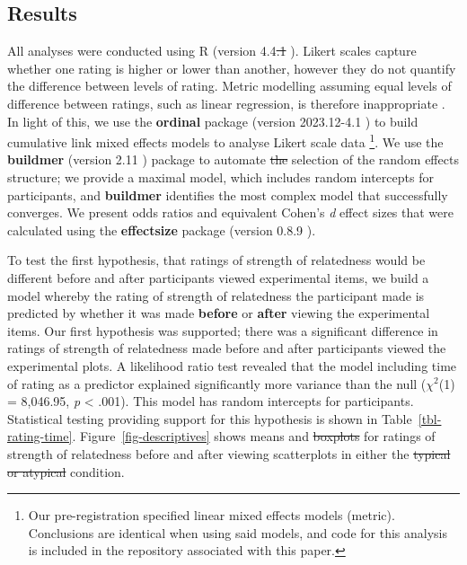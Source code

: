 \documentclass[manuscript,screen,review,anonymous]{acmart}
\providecommand{\DIFaddtex}[1]{{\protect\color{blue}\uwave{#1}}} %
\providecommand{\DIFdeltex}[1]{{\protect\color{red}\sout{#1}}} %
\providecommand{\DIFaddbegin}{} %
\providecommand{\DIFaddend}{} %
\providecommand{\DIFdelbegin}{} %
\providecommand{\DIFdelend}{} %
\providecommand{\DIFadd}[1]{\texorpdfstring{\DIFaddtex{#1}}{#1}} %
\providecommand{\DIFdel}[1]{\texorpdfstring{\DIFdeltex{#1}}{}} %
\newcommand{\DIFscaledelfig}{0.5}
\newlength{\DIFdelgraphicswidth} %
\newlength{\DIFdelgraphicsheight} %
\newcommand{\DIFaddincludegraphics}[2][]{{\color{blue}\fbox{\DIFOincludegraphics[#1]{#2}}}} %
\newcommand{\DIFdelincludegraphics}[2][]{%
\sbox{\DIFdelgraphicsbox}{\DIFOincludegraphics[#1]{#2}}%
\settoboxwidth{\DIFdelgraphicswidth}{\DIFdelgraphicsbox} %
\settoboxtotalheight{\DIFdelgraphicsheight}{\DIFdelgraphicsbox} %
\scalebox{\DIFscaledelfig}{%
\parbox[b]{\DIFdelgraphicswidth}{\usebox{\DIFdelgraphicsbox}\\[-\baselineskip] \rule{\DIFdelgraphicswidth}{0em}}\llap{\resizebox{\DIFdelgraphicswidth}{\DIFdelgraphicsheight}{%
\setlength{\unitlength}{\DIFdelgraphicswidth}%
\begin{picture}(1,1)%
\thicklines\linethickness{2pt} %
{\color[rgb]{1,0,0}\put(0,0){\framebox(1,1){}}}%
{\color[rgb]{1,0,0}\put(0,0){\line( 1,1){1}}}%
{\color[rgb]{1,0,0}\put(0,1){\line(1,-1){1}}}%
\end{picture}%
}\hspace*{3pt}}} %
} %
\DeclareRobustCommand{\DIFaddbegin}{\DIFOaddbegin \let\includegraphics\DIFaddincludegraphics} %
\DeclareRobustCommand{\DIFaddend}{\DIFOaddend \let\includegraphics\DIFOincludegraphics} %
\DeclareRobustCommand{\DIFdelbegin}{\DIFOdelbegin \let\includegraphics\DIFdelincludegraphics} %
\DeclareRobustCommand{\DIFdelend}{\DIFOaddend \let\includegraphics\DIFOincludegraphics} %
\begin{document}
\subsection{Results}\label{sec-results-main}

All analyses were conducted using R (version 4.4\DIFdelbegin \DIFdel{.1 }\DIFdelend \DIFaddbegin \DIFadd{.2 }\DIFaddend \citep{rcore}).
Likert scales capture whether one rating is higher or lower than
another, however they do not quantify the difference between levels of
rating. Metric modelling assuming equal levels of difference between
ratings, such as linear regression, is therefore inappropriate
\citep{liddell_2018}. In light of this, we use the \textbf{ordinal}
package (version 2023.12-4.1 \citep{ordinal}) to build cumulative link
mixed effects models to analyse Likert scale data \footnote{Our
  pre-registration specified linear mixed effects models (metric).
  Conclusions are identical when using said models, and code for this
  analysis is included in the repository associated with this paper.}.
We use the \textbf{buildmer} (version 2.11 \citep{buildmer}) package to
automate \DIFdelbegin \DIFdel{the }\DIFdelend selection of the random effects structure; we provide a maximal
model, which includes random intercepts for participants, and
\textbf{buildmer} identifies the most complex model that successfully
converges. We present odds ratios and equivalent Cohen's \emph{d} effect
sizes that were calculated using the \textbf{effectsize} package
(version 0.8.9 \citep{effectsize}).

To test the first hypothesis, that ratings of strength of relatedness
would be different before and after participants viewed experimental
items, we build a model whereby the rating of strength of relatedness
the participant made is predicted by whether it was made \textbf{before}
or \textbf{after} viewing the experimental items. Our first hypothesis
was supported; there was a significant difference in ratings of strength
of relatedness made before and after participants viewed the
experimental plots. A likelihood ratio test revealed that the model
including time of rating as a predictor explained significantly more
variance than the null (\(\chi^2\)(1) = 8,046.95, \emph{p} \textless{}
.001). This model has random intercepts for participants. Statistical
testing providing support for this hypothesis is shown in
Table~\ref{tbl-rating-time}. Figure~\ref{fig-descriptives} shows means
and \DIFdelbegin \DIFdel{boxplots }\DIFdelend \DIFaddbegin \DIFadd{violin plots }\DIFaddend for ratings of strength of relatedness before and after
viewing scatterplots in either the \DIFdelbegin \DIFdel{typical or atypical }\DIFdelend \DIFaddbegin \DIFadd{standard or alternative }\DIFaddend condition.
\end{document}
